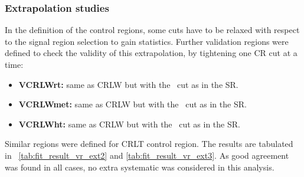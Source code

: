 

\clearpage

\subsubsection{Extrapolation studies}
\label{sec:vr_extrapolation}

In the definition of the control regions, some cuts have to be relaxed with respect to the signal region selection to gain statistics.
Further validation regions were defined to check the validity of this extrapolation, by tightening one CR cut at a time:

\begin{itemize}
\item \textbf{VCRLWrt:}  same as CRLW but with the \rtfour\ cut as in the SR.
\item \textbf{VCRLWmet:} same as CRLW but with the \met\ cut as in the SR.
\item \textbf{VCRLWht:}  same as CRLW but with the \HT\ cut as in the SR.
\end{itemize}
%
Similar regions were defined for CRLT control region. The results are tabulated in \Tab\ \ref{tab:fit_result_vr_ext2} and \ref{tab:fit_result_vr_ext3}. As good agreement was found in all cases, no extra systematic was considered in this analysis.


